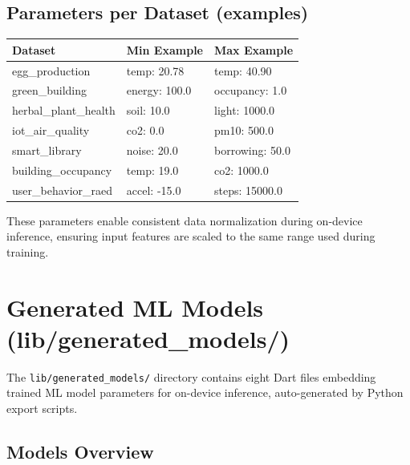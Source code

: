 \documentclass[12pt,a4paper,oneside]{report}
\begin{document}
\section{Parameters per Dataset (examples)}

\begin{longtable}{p{3.5cm} p{3.5cm} p{3.5cm}}
\toprule
\textbf{Dataset} & \textbf{Min Example} & \textbf{Max Example} \\
\midrule
\endhead
\bottomrule
\endfoot
egg\_production & temp: 20.78 & temp: 40.90 \\
green\_building & energy: 100.0 & occupancy: 1.0 \\
herbal\_plant\_health & soil: 10.0 & light: 1000.0 \\
iot\_air\_quality & co2: 0.0 & pm10: 500.0 \\
smart\_library & noise: 20.0 & borrowing: 50.0 \\
building\_occupancy & temp: 19.0 & co2: 1000.0 \\
user\_behavior\_raed & accel: -15.0 & steps: 15000.0 \\
\bottomrule
\end{longtable}

These parameters enable consistent data normalization during on-device inference, ensuring input features are scaled to the same range used during training.

\chapter{Generated ML Models (lib/generated\_models/)}
\label{ch:gen_models}

The \texttt{lib/generated\_models/} directory contains eight Dart files embedding trained ML model parameters for on-device inference, auto-generated by Python export scripts.

\section{Models Overview}
\end{document}
